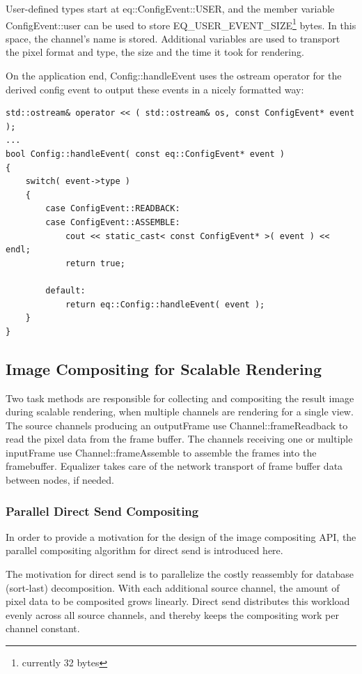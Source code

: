 \documentclass[10pt,a4]{scrartcl}
\begin{document}
User-defined types start at \textsf{eq::ConfigEvent::USER}, and the
member variable \textsf{ConfigEvent::user} can be used to store
\textsf{EQ\_USER\_EVENT\_SIZE}\footnote{currently 32 bytes} bytes. In
this space, the channel's name is stored. Additional variables are used
to transport the pixel format and type, the size and the time it took
for rendering.

On the application end, \textsf{Config::handleEvent} uses the ostream
operator for the derived config event to output these events in a nicely
formatted way:

{\footnotesize\begin{lstlisting}
std::ostream& operator << ( std::ostream& os, const ConfigEvent* event );
...
bool Config::handleEvent( const eq::ConfigEvent* event )
{
    switch( event->type )
    {
        case ConfigEvent::READBACK:
        case ConfigEvent::ASSEMBLE:
            cout << static_cast< const ConfigEvent* >( event ) << endl;
            return true;

        default:
            return eq::Config::handleEvent( event );
    }
}
\end{lstlisting}}%


\subsection{\label{sCompositing}Image Compositing for Scalable Rendering}

Two task methods are responsible for collecting and compositing the
result image during scalable rendering, when multiple channels are
rendering for a single view. The source channels producing an
\textsf{outputFrame} use \textsf{Channel::frameReadback} to read the
pixel data from the frame buffer. The channels receiving one or multiple
\textsf{inputFrame} use \textsf{Channel::frameAssemb\-le} to assemble
the frames into the framebuffer. Equalizer takes care of the network
transport of frame buffer data between nodes, if needed.

\subsubsection{Parallel Direct Send Compositing}

In order to provide a motivation for the design of the image compositing
API, the parallel compositing algorithm for direct send is introduced
here. 

The motivation for direct send is to parallelize the costly reassembly
for database (sort-last) decomposition. With each additional source
channel, the amount of pixel data to be composited grows
linearly. Direct send distributes this workload evenly across all source
channels, and thereby keeps the compositing work per channel constant.
\end{document}
